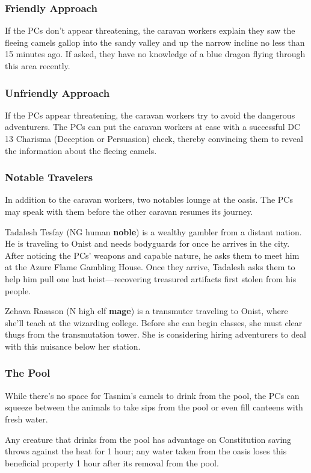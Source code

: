 \documentclass[10pt,a4paper,twoside,bg=print,twocolumn,openany,nodeprecatedcode]{dndbook}
\begin{document}
\subsubsection{Friendly Approach}
If the PCs don't appear threatening, the caravan workers explain they saw the fleeing camels gallop into the sandy valley and up the narrow incline no less than 15 minutes ago. If asked, they have no knowledge of a blue dragon flying through this area recently.

\subsubsection{Unfriendly Approach}
If the PCs appear threatening, the caravan workers try to avoid the dangerous adventurers. The PCs can put the caravan workers at ease with a successful DC 13 Charisma (Deception or Persuasion) check, thereby convincing them to reveal the information about the fleeing camels.

\subsubsection{Notable Travelers}
In addition to the caravan workers, two notables lounge at the oasis. The PCs may speak with them before the other caravan resumes its journey.

Tadalesh Tesfay (NG human \textbf{noble}) is a wealthy gambler from a distant nation. He is traveling to Onist and needs bodyguards for once he arrives in the city. After noticing the PCs' weapons and capable nature, he asks them to meet him at the Azure Flame Gambling House. Once they arrive, Tadalesh asks them to help him pull one last heist—recovering treasured artifacts first stolen from his people.

Zehava Rasason (N high elf \textbf{mage}) is a transmuter traveling to Onist, where she'll teach at the wizarding college. Before she can begin classes, she must clear thugs from the transmutation tower. She is considering hiring adventurers to deal with this nuisance below her station.

\subsubsection{The Pool}
While there's no space for Tasnim's camels to drink from the pool, the PCs can squeeze between the animals to take sips from the pool or even fill canteens with fresh water.

Any creature that drinks from the pool has advantage on Constitution saving throws against the heat for 1 hour; any water taken from the oasis loses this beneficial property 1 hour after its removal from the pool.
\end{document}
